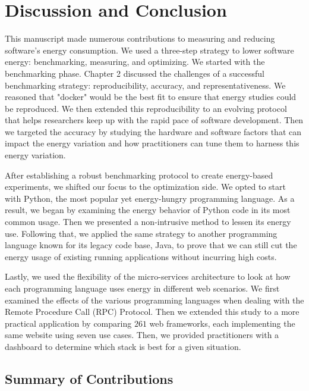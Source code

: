 \clearpage
\chapter{Discussion and Conclusion}
\label{chapter:conclusion}

This manuscript made numerous contributions to measuring and reducing software's energy consumption. We used a three-step strategy to lower software energy:  benchmarking, measuring, and optimizing.
We started with the benchmarking phase. Chapter 2 discussed the challenges of a successful benchmarking strategy: reproducibility, accuracy, and representativeness. We reasoned that "docker" would be the best fit to ensure that energy studies could be reproduced. We then extended this reproducibility to an evolving protocol that helps researchers keep up with the rapid pace of software development.
Then we targeted the accuracy by studying the hardware and software factors that can impact the energy variation and how practitioners can tune them to harness this energy variation.

After establishing a robust benchmarking protocol to create energy-based experiments, we shifted our focus to the optimization side. We opted to start with Python, the most popular yet energy-hungry programming language. As a result, we began by examining the energy behavior of Python code in its most common usage. Then we presented a non-intrusive method to lessen its energy use. Following that, we applied the same strategy to another programming language known for its legacy code base, Java, to prove that we can still cut the energy usage of existing running applications without incurring high costs.

Lastly, we used the flexibility of the micro-services architecture to look at how each programming language uses energy in different web scenarios. We first examined the effects of the various programming languages when dealing with the Remote Procedure Call (RPC) Protocol. Then we extended this study to a more practical application by comparing $261$ web frameworks, each implementing the same website using seven use cases. Then, we provided practitioners with a dashboard to determine which stack is best for a given situation.


\section{Summary of Contributions}
\label{section:SummaryofContributions}

